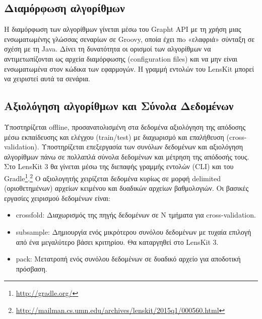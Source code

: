 \subsection{Διαμόρφωση αλγορίθμων}
Η διαμόρφωση των αλγορίθμων γίνεται μέσω του \en Grapht API \el με τη χρήση μιας ενσωματωμένης γλώσσας σεναρίων σε \en Groovy,  οποία έχει πιo «ελαφριά» σύνταξη σε σχέση με τη \en Java. \el Δίνει τη δυνατότητα οι ορισμοί των αλγορίθμων να αντιμετωπίζονται ως αρχεία διαμόρφωσης ({\en configuration files}) και να μην είναι ενσωματωμένα στον κώδικα των εφαρμογών. Η γραμμή εντολών του \en LensKit \el μπορεί να χειριστεί αυτά τα σενάρια.
\subsection{Αξιολόγηση αλγορίθμων και Σύνολα Δεδομένων}
Υποστηρίζεται {\en offline}, προσανατολισμένη στα δεδομένα αξιολόγηση της απόδοσης μέσω εκπαίδευσης και ελέγχου ({\en train/test}) με διαχωρισμό και επαλήθευση ({\en cross-validation}). Υποστηρίζεται επεξεργασία των συνόλων δεδομένων και αξιολόγηση αλγορίθμων πάνω σε πολλαπλά σύνολα δεδομένων και μέτρηση της απόδοσής τους. Στο {\en LensKit 3} θα γίνεται μέσω της διεπαφής γραμμής εντολών ({\en CLI}) και του {\en Gradle}\footnote{\en \url{http://gradle.org/}}.\footnote{\en \url{http://mailman.cs.umn.edu/archives/lenskit/2015q1/000560.html}} Ο αξιολογητής χειρίζεται δεδομένα κυρίως σε μορφή {\en delimited} (οριοθετημένων) αρχείων κειμένου και δυαδικών αρχείων βαθμολογιών. Οι βασικές εργασίες χειρισμού δεδομένων είναι: 
\begin{itemize}
 \item {\en crossfold}: Διαχωρισμός της πηγής δεδομένων σε Ν τμήματα για {\en cross-validation}.
 \item {\en subsample}: Δημιουργία ενός μικρότερου συνόλου δεδομένων με τυχαία επιλογή από ένα μεγαλύτερο βάσει κριτηρίου. Θα καταργηθεί στο {\en LensKit 3}.
 \item {\en pack}: Μετατροπή ενός συνόλου δεδομένων σε δυαδικό αρχείο για αποδοτική πρόσβαση.
\end{itemize}
